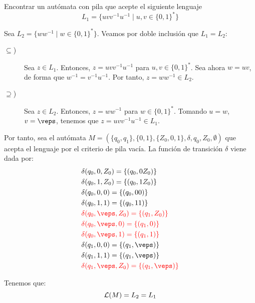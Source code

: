 \begin{ejercicio}\label{ej:1.5.14}
    Encontrar un autómata con pila que acepte el siguiente lenguaje
    \begin{equation*}
        L_1 = \{uvv^{-1}u^{-1}\mid u,v\in {\{0,1\}}^{\ast}\}
    \end{equation*}

    Sea $L_2=\{ww^{-1}\mid w\in {\{0,1\}}^{\ast}\}$. Veamos por doble inclusión que $L_1=L_2$:
    \begin{description}
        \item[$\subseteq$)] Sea $z\in L_1$. Entonces, $z=uvv^{-1}u^{-1}$ para $u,v\in {\{0,1\}}^{\ast}$. Sea ahora $w=uv$, de forma que $w^{-1}=v^{-1}u^{-1}$. Por tanto, $z=ww^{-1}\in L_2$.
        \item[$\supseteq$)] Sea $z\in L_2$. Entonces, $z=ww^{-1}$ para $w\in {\{0,1\}}^{\ast}$. Tomando $u=w$, $v=\veps$, tenemos que $z=uvv^{-1}u^{-1}\in L_1$.
    \end{description}

    Por tanto, sea el autómata $M = (\{q_0,q_1\},\{0,1\},\{Z_0,0,1\},\delta,q_0,Z_0,\emptyset)$ que acepta el lenguaje por el criterio de pila vacía. La función de transición $\delta$ viene dada por:
    \begin{align*}
        &\delta(q_0,0,Z_0) = \{(q_0,0Z_0)\} \\
        &\delta(q_0,1,Z_0) = \{(q_0,1Z_0)\} \\
        &\delta(q_0,0,0) = \{(q_0,00)\} \\
        &\delta(q_0,1,1) = \{(q_0,11)\} \\
        &\red{\delta(q_0,\veps,Z_0) = \{(q_1,Z_0)\}} \\
        &\red{\delta(q_0,\veps,0) = \{(q_1,0)\}} \\
        &\red{\delta(q_0,\veps,1) = \{(q_1,1)\}} \\
        &\delta(q_1,0,0) = \{(q_1,\veps)\} \\
        &\delta(q_1,1,1) = \{(q_1,\veps)\} \\
        &\red{\delta(q_1,\veps,Z_0) = \{(q_1,\veps)\}}
    \end{align*}

    Tenemos que:
    \begin{equation*}
        \mathcal{L}(M)=L_2=L_1
    \end{equation*}
\end{ejercicio}

